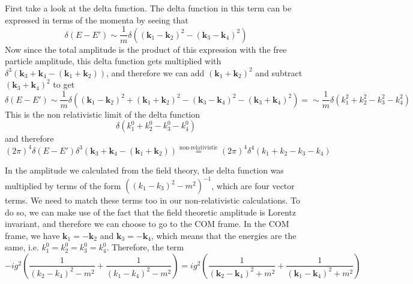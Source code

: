 \documentclass[11pt]{article}
\numberwithin{equation}{section}
\begin{document}
    First take a look at the delta function. The delta function in this term can be expressed in terms of the momenta by seeing that 
    \begin{equation*}
        \delta(E-E') \sim \frac{1}{m}\delta\left((\textbf{k}_1 - \textbf{k}_2)^2 - (\textbf{k}_3 - \textbf{k}_4)^2\right)
    \end{equation*} 
    Now since the total amplitude is the product of this expression with the free particle amplitude, this delta function gets multiplied with \(\delta^3(\textbf{k}_3 +  \textbf{k}_4 - (\textbf{k}_1 + \textbf{k}_2))\), and therefore we can add \((\textbf{k}_1 + \textbf{k}_2)^2\)   and subtract \((\textbf{k}_3 + \textbf{k}_4)^2\) to get 
    \begin{equation*}
        \delta(E-E') \sim \frac{1}{m}\delta\left((\textbf{k}_1 - \textbf{k}_2)^2 + (\textbf{k}_1 + \textbf{k}_2)^2 - (\textbf{k}_3 - \textbf{k}_4)^2 - (\textbf{k}_3 + \textbf{k}_4)^2\right) = \sim \frac{1}{m}\delta(k_1^2 + k_2^2 - k_3^2 - k_4^2)
    \end{equation*}
    This is the non relativistic limit of the delta function 
    \begin{equation*}
        \delta(k_1^0 + k_2^0 - k_3^0 - k_4^0)
    \end{equation*}
    and therefore 
    \begin{equation*}
         (2\pi)^4\delta(E-E')\delta^3(\textbf{k}_3 +  \textbf{k}_4 - (\textbf{k}_1 + \textbf{k}_2))\overset{\text{non-relativistic}}{=}(2\pi)^4\delta^4(k_1 + k_2 - k_3 - k_4) 
    \end{equation*}

    In the amplitude we calculated from the field theory, the delta function was multiplied by terms of the form \(((k_1 - k_3)^2 - m^2)^{-1}\), which are four vector terms. We need to match these terms too in our non-relativistic calculations. To do so, we can make use of the fact that the field theoretic amplitude is Lorentz invariant, and therefore we can choose to go to the COM frame. In the COM frame, we have \(\textbf{k}_1 = -\textbf{k}_2\) and \(\textbf{k}_3 = -\textbf{k}_4\), which means that the energies are the same, i.e. \(k_1^0 = k_2^0 = k_3^0 = k_4^0\). Therefore, the term
    \begin{equation*}
        -ig^2\left( \frac{1}{(k_2 - k_4)^2 - m^2} + \frac{1}{(k_1 - k_4)^2 - m^2 } \right) = ig^2\left( \frac{1}{(\textbf{k}_2 - \textbf{k}_4)^2 + m^2} + \frac{1}{(\textbf{k}_1 - \textbf{k}_4)^2 + m^2 } \right)
    \end{equation*}
\end{document}
